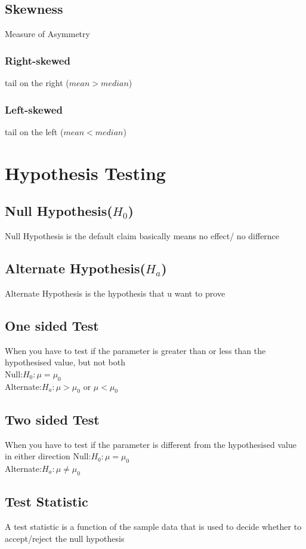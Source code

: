 \documentclass[12pt]{extarticle}
\begin{document}
\subsection{Skewness} 
Measure of Asymmetry  
\subsubsection{Right-skewed} 
tail on the right (\(mean > median\)) 

\subsubsection{Left-skewed}
tail on the left (\(mean < median\))

\section{Hypothesis Testing}

\subsection{Null Hypothesis($H_0$)}
Null Hypothesis is the default claim basically means no effect/ no differnce

\subsection{Alternate Hypothesis($H_a$)}
Alternate Hypothesis is the hypothesis that u want to prove

\subsection{One sided Test}
When you have to test if the parameter is greater than or less than the 
hypothesised value, but not both \\
Null:$H_0: \mu = \mu_0 $ \\
Alternate:$H_a: \mu > \mu_0$ or $\mu < \mu_0$

\subsection{Two sided Test}
When you have to test if the parameter is different from the hypothesised value
in either direction
Null:$H_0: \mu = \mu_0 $ \\
Alternate:$H_a: \mu \neq \mu_0$

\subsection{Test Statistic}
A test statistic is a function of the sample data that is used to decide
whether to accept/reject the null hypothesis
\end{document}
